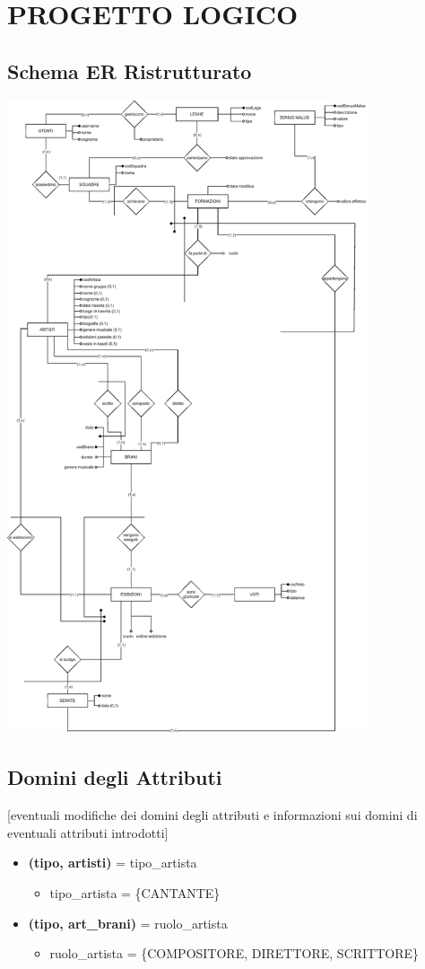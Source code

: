 \documentclass[a4paper,12pt]{article}
\begin{document}
\newpage
\section{PROGETTO LOGICO}
\subsection{Schema ER Ristrutturato}
\begin{center}
	\includegraphics[width=0.8\textwidth]{schema_ER_ristrutturato.eps}
\end{center}

\subsection{Domini degli Attributi}
[eventuali modifiche dei domini degli attributi e informazioni sui domini di eventuali attributi introdotti]
\begin{itemize}
	\item \textbf{(tipo, artisti)} = tipo\_artista
	\begin{itemize}
		\item tipo\_artista = \{CANTANTE\}
	\end{itemize}
	\item \textbf{(tipo, art\_brani)} = ruolo\_artista
	\begin{itemize}
		\item ruolo\_artista = \{COMPOSITORE, DIRETTORE, SCRITTORE\}
	\end{itemize}
\end{itemize}
\end{document}
